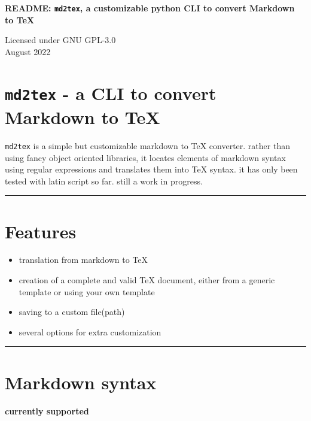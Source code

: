 \documentclass[a4paper, 12pt, twoside]{article}
\begin{document}
\begin{centering}
    \vspace{2cm}
        \begin{large}
            \textbf{README: \texttt{md2tex}, a customizable python CLI to convert Markdown to TeX}
        \end{large}
        \bigskip
            Licensed under GNU GPL-3.0\\August 2022
    \vspace{2cm}
\end{centering}

\section*{\texttt{md2tex} - a CLI to convert Markdown to TeX}

\texttt{md2tex} is a simple but customizable markdown to TeX converter. rather than using fancy object oriented 
libraries, it locates elements of markdown syntax using regular expressions and translates them into TeX syntax.
it has only been tested with latin script so far. still a work in progress.

\par\noindent\rule{\linewidth}{0.4pt}
\section*{Features}

\begin{itemize}
\item translation from markdown to TeX
\item creation of a complete and valid TeX document, either from a generic template or using your own template
\item saving to a custom file(path)
\item several options for extra customization 
\end{itemize}

\par\noindent\rule{\linewidth}{0.4pt}
\section*{Markdown syntax}

\textbf{currently supported}
\end{document}

